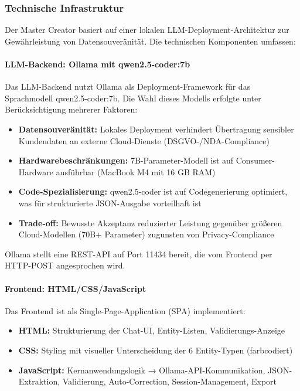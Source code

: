 \subsubsection{Technische Infrastruktur}

Der Master Creator basiert auf einer lokalen LLM-Deployment-Architektur zur Gewährleistung von Datensouveränität. Die technischen Komponenten umfassen:

\paragraph{LLM-Backend: Ollama mit qwen2.5-coder:7b}

Das LLM-Backend nutzt Ollama \cite{ollama:local_llm2024} als Deployment-Framework für das Sprachmodell qwen2.5-coder:7b. Die Wahl dieses Modells erfolgte unter Berücksichtigung mehrerer Faktoren:

\begin{itemize}
    \item \textbf{Datensouveränität:} Lokales Deployment verhindert Übertragung sensibler Kundendaten an externe Cloud-Dienste (DSGVO-/NDA-Compliance)
    \item \textbf{Hardwarebeschränkungen:} 7B-Parameter-Modell ist auf Consumer-Hardware ausführbar (MacBook M4 mit 16 GB RAM)
    \item \textbf{Code-Spezialisierung:} qwen2.5-coder ist auf Codegenerierung optimiert, was für strukturierte JSON-Ausgabe vorteilhaft ist
    \item \textbf{Trade-off:} Bewusste Akzeptanz reduzierter Leistung gegenüber größeren Cloud-Modellen (70B+ Parameter) zugunsten von Privacy-Compliance
\end{itemize}

\noindent Ollama stellt eine REST-API auf Port 11434 bereit, die vom Frontend per HTTP-POST angesprochen wird.

\paragraph{Frontend: HTML/CSS/JavaScript}

Das Frontend ist als Single-Page-Application (SPA) implementiert:

\begin{itemize}
    \item \textbf{HTML:} Strukturierung der Chat-UI, Entity-Listen, Validierungs-Anzeige
    \item \textbf{CSS:} Styling mit visueller Unterscheidung der 6 Entity-Typen (farbcodiert)
    \item \textbf{JavaScript:} Kernanwendungslogik → Ollama-API-Kommunikation, JSON-Extraktion, Validierung, Auto-Correction, Session-Management, Export
\end{itemize}

